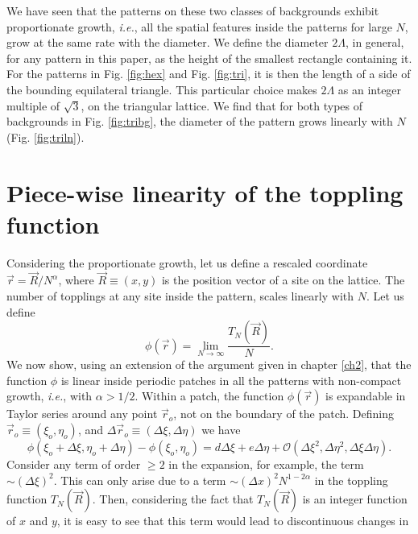 \documentclass[11pt,a4paper]{book}
\begin{document}
We have seen that the patterns on these two classes of backgrounds
exhibit proportionate growth, \textit{i.e.}, all the spatial features
inside the patterns for large $N$, grow at the same rate with the
diameter. We define the diameter $2\Lambda$, in general, for any pattern in
this paper, as the height of the smallest rectangle containing it. For
the patterns in Fig. \ref{fig:hex} and Fig. \ref{fig:tri}, it is then
the length of a side of the bounding
equilateral triangle.
This particular choice makes $2\Lambda$ as
an integer multiple of $\sqrt{3}$, on the triangular lattice. We find that for both types of backgrounds
in Fig. \ref{fig:tribg}, the diameter of the pattern grows linearly
with $N$ (Fig. \ref{fig:triln}).
\section{Piece-wise linearity of the toppling function\label{sec:pwl}}
Considering the proportionate growth, let us define a rescaled
coordinate $\vec r=\vec R /N^{\alpha}$,
where $\vec R\equiv\left( x,y \right)$ is the position vector of a
site on the lattice.
The number of topplings at any site inside the pattern, scales linearly with
$N$. Let us define
\begin{equation}
\phi\left( \vec r \right)=\lim_{N\rightarrow
\infty}\frac{T_{N}( \vec R )}{N}.
\end{equation}
We now show, using an extension of the argument given in chapter
\ref{ch2},
that the function $\phi$ is linear inside periodic patches
in all the patterns with non-compact growth, \textit{i.e.}, with
$\alpha>1/2$. Within a patch, the function
$\phi(\vec r)$ is expandable in Taylor series around any point
$\vec r_{o}$, not on the boundary of the patch. Defining $\vec r_{o}\equiv\left( \xi_{o},
\eta_{o} \right)$, and
$\Delta\vec r_{o}\equiv\left( \Delta\xi, \Delta\eta \right)$ we have
\begin{equation}
\phi\left( \xi_{o}+ \Delta \xi, \eta_{o}+\Delta\eta \right)-\phi\left(
\xi_{o}, \eta_{o} \right)=d\Delta\xi+e\Delta\eta+\mathcal{O}\left(
\Delta\xi^{2},\Delta\eta^{2},\Delta\xi\Delta\eta \right).
\end{equation}
Consider any term of order $\ge 2$ in the expansion, for example, the term
$\sim(\Delta\xi)^2$. This can only arise due to a term $\sim (\Delta
x)^2N^{1-2\alpha}$ in the toppling function $T_{N}(
\vec R)$.
Then, considering the fact that $T_{N}(
\vec R )$ is an integer function of $x$ and $y$, it is easy
to see that this term would lead to discontinuous changes in
\end{document}
